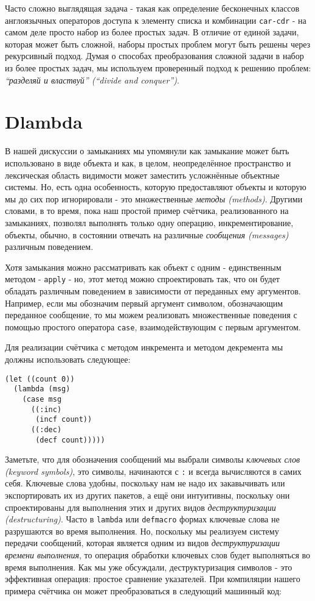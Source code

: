 Часто сложно выглядящая задача - такая как определение бесконечных классов англоязычных операторов доступа к элементу списка и комбинации \verb"car-cdr" - на самом деле просто набор из более простых задач. В отличие от единой задачи, которая может быть сложной, наборы простых проблем могут быть решены через рекурсивный подход. Думая о способах преобразования сложной задачи в набор из более простых задач, мы используем проверенный подход к решению проблем: \emph{``разделяй и властвуй'' (``divide and conquer'')}.

\section{Dlambda}\label{section_dlambda}

В нашей дискуссии о замыканиях мы упомянули как замыкание может быть использовано в виде объекта и как, в целом, неопределённое пространство и лексическая область видимости может заместить усложнённые объектные системы. Но, есть одна особенность, которую предоставляют объекты и которую мы до сих пор игнорировали - это множественные \emph{методы (methods)}. Другими словами, в то время, пока наш простой пример счётчика, реализованного на замыканиях, позволял выполнять только одну операцию, инкрементирование, объекты, обычно, в состоянии отвечать на различные \emph{сообщения (messages)} различным поведением.

Хотя замыкания можно рассматривать как объект с одним - единственным методом - \verb"apply" - но, этот метод можно спроектировать так, что он будет обладать различным поведением в зависимости от переданных ему аргументов. Например, если мы обозначим первый аргумент символом, обозначающим переданное сообщение, то мы можем реализовать множественные поведения с помощью простого оператора \verb"case", взаимодействующим с первым аргументом.

Для реализации счётчика с методом инкремента и методом декремента мы должны использовать следующее:

\begin{verbatim}
(let ((count 0))
  (lambda (msg)
    (case msg
      ((:inc)
       (incf count))
      ((:dec)
       (decf count)))))
\end{verbatim}

Заметьте, что для обозначения сообщений мы выбрали символы \emph{ключевых слов (keyword symbols)}, это символы, начинаются с \verb":" и всегда вычисляются в самих себя. Ключевые слова удобны, поскольку нам не надо их закавычивать или экспортировать их из других пакетов, а ещё они интуитивны, поскольку они спроектированы для выполнения этих и других видов \emph{деструктуризации (destructuring)}. Часто в \verb"lambda" или \verb"defmacro" формах ключевые слова не разрушаются во время выполнения. Но, поскольку мы реализуем систему передачи сообщений, которая является одним из видов \emph{деструктуризации времени выполнения}, то операция обработки ключевых слов будет выполняться во время выполнения. Как мы уже обсуждали, деструктуризация символов - это эффективная операция: простое сравнение указателей. При компиляции нашего примера счётчика он может преобразоваться в следующий машинный код:

